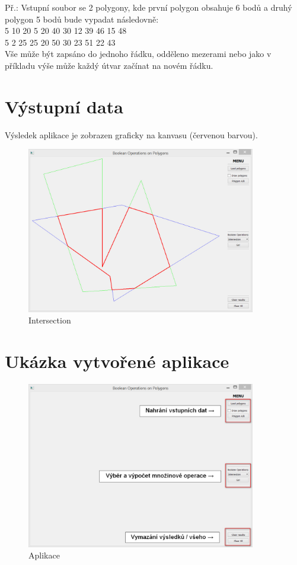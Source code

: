 \documentclass[a4paper, 12pt]{article}
\begin{document}
Př.: Vstupní soubor se 2 polygony, kde první polygon obsahuje 6 bodů a druhý polygon 5 bodů bude vypadat následovně:\\
 
 5 10 20 5 20 40 30 12 39 46 15 48\\
5 2 25 25 20 50 30 23 51 22 43\\

Vše může být zapsáno do jednoho řádku, odděleno mezerami nebo jako v příkladu výše může každý útvar začínat na novém řádku.\\

\section{Výstupní data}
Výsledek aplikace je zobrazen graficky na kanvasu (červenou barvou).

\begin{figure}[h]
	\centering
	\includegraphics[width=10cm]{inter.jpg}
	\caption{Intersection}
\end{figure}
\clearpage
\section{Ukázka vytvořené aplikace}
\begin{figure}[h]
	\centering
	\includegraphics[width=10cm]{ap.jpg}
	\caption{Aplikace}
\end{figure}
\end{document}
